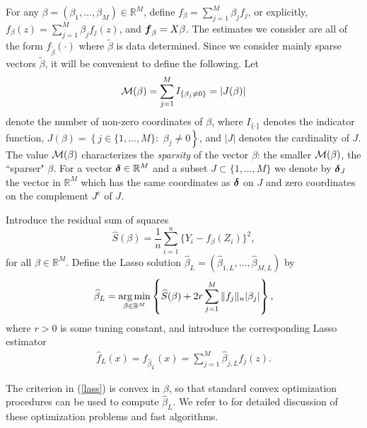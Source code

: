 \documentclass[dvips,aos]{imsart}
\numberwithin{equation}{section}
\theoremstyle{plain}
\def\argmin{\mathop{\mathrm{arg\,min}}}
\def\sf{}
\def\scm{{\cal M}}
\def\wh{\widehat}
\def\RR{\mathbb R}
\newcommand{\bD}{\mbox{\boldmath$\delta$}}
\newcommand{\bmf}{\mbox{\boldmath$f$}}
\def\argmin{\mathop{\rm arg\, min}}
\begin{document}
 For any
$\beta= (\beta_1,\dots,\beta_M)\in \RR^M$, define ${\sf
f}_{\beta} = \sum_{j=1}^M \beta_j f_j$, or explicitly, ${\sf
f}_{\beta}(z) = \sum_{j=1}^M \beta_j f_j(z)$, and $\bmf_\beta =X\beta$.
The estimates we consider are all of the form ${ f}_{\tilde \beta} (\cdot)$
where $\tilde \beta$ is data determined.
Since we consider mainly sparse vectors $\tilde \beta$, it will be convenient to define the following. Let $$ \scm(\beta)= \sum_{j=1}^M I_{\{ \beta_j\ne 0\}} =
|J(\beta)|$$ denote the number of non-zero coordinates of
$\beta$, where $I_{\{ \cdot\}}$ denotes the indicator function,
$J(\beta)=\left \{j\in\{1,\ldots,M\} \right.:$ $\left. \beta_j
\ne 0\right\}$, and $|J|$ denotes the cardinality of $J$. The value
$\scm(\beta)$ characterizes the {\it sparsity} of the vector
$\beta$: the smaller $\scm(\beta)$, the ``sparser"
 $\beta$.
For a vector $\bD\in \RR^M$ and a subset $J\subset \{1,\dots,M\}$ we
denote by $\bD_J$ the vector in $\RR^M$ which has the same
coordinates as $\bD$ on $J$ and zero coordinates on the complement
$J^c$ of $J$.





 Introduce the residual sum of squares
$$ \wh{S} (\beta) = \frac1n \sum_{i=1}^n \{ Y_i - {\sf
f}_{\beta}(Z_i) \}^2,$$ for all $\beta\in\RR^M$.  Define the
Lasso solution $\wh{\beta}_L =
(\wh{\beta}_{1,L},\dots,\wh{\beta}_{M,L})$ by
\begin{equation}\begin{split}\label{lass}
\wh{\beta}_L = \argmin_{\beta\in\RR^M} \left\{ \wh{S}(\beta) +
2r\sum_{j=1}^M  \|f_j\|_n |\beta_j| \right\},
\end{split}\end{equation}
where $r>0$ is some tuning constant, and introduce the corresponding Lasso
estimator
\begin{equation}\begin{split}
\label{lse} \widehat{f}_L(x)={\sf
f}_{\wh{\beta}_L}(x) =\sum_{j=1}^M \wh{\beta}_{j,L} f_j(z).
\end{split}\end{equation}

The criterion in (\ref{lass}) is convex in $\beta$, so that standard
convex optimization procedures can be used to compute
$\wh{\beta}_L$. We refer to
\cite{os00a,os00b,ehjt04,t05,fjht07,mvb08} for detailed discussion
of these optimization problems and fast algorithms.
\end{document}
